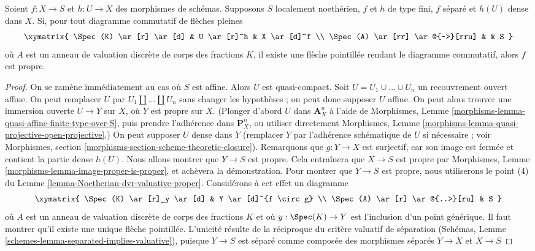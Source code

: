 \begin{lemma}
\label{lemma-refined-valuative-criterion-proper}
Soient $f : X \to S$ et $h : U \to X$ des morphismes de schémas.
Supposons $S$ localement noethérien, $f$ et $h$ de type fini,
$f$ séparé et $h(U)$ dense dans $X$.
Si, pour tout diagramme commutatif de flèches pleines
$$
\xymatrix{
\Spec(K) \ar[r] \ar[d] & U \ar[r]^h & X \ar[d]^f \\
\Spec(A) \ar[rr] \ar@{-->}[rru] & & S
}
$$
où $A$ est un anneau de valuation discrète de corps des fractions $K$,
il existe une flèche pointillée rendant le diagramme commutatif, alors $f$ est propre.
\end{lemma}

\begin{proof}
On se ramène immédiatement au cas où $S$ est affine.
Alors $U$ est quasi-compact.
Soit $U = U_1 \cup \ldots \cup U_n$ un recouvrement ouvert affine.
On peut remplacer $U$ par $U_1 \amalg \ldots \amalg U_n$ sans
changer les hypothèses ; on peut donc supposer $U$ affine.
On peut alors trouver une immersion ouverte $U \to Y$ sur $X$,
où $Y$ est propre sur $X$. (Plonger d'abord $U$ dans $\mathbf{A}^n_X$
à l'aide de Morphismes, Lemme \ref{morphisms-lemma-quasi-affine-finite-type-over-S},
puis prendre l'adhérence dans $\mathbf{P}^n_X$, ou utiliser directement
Morphismes, Lemme \ref{morphisms-lemma-quasi-projective-open-projective}.)
On peut supposer $U$ dense dans $Y$ (remplacer $Y$ par l'adhérence schématique
de $U$ si nécessaire ; voir Morphismes, section
\ref{morphisms-section-scheme-theoretic-closure}).
Remarquons que $g : Y \to X$ est surjectif, car son image est fermée
et contient la partie dense $h(U)$.
Nous allons montrer que $Y \to S$ est propre. Cela entraînera que
$X \to S$ est propre par
Morphismes, Lemme \ref{morphisms-lemma-image-proper-is-proper},
et achèvera la démonstration.
Pour montrer que $Y \to S$ est propre, nous utiliserons
le point (4) du Lemme \ref{lemma-Noetherian-dvr-valuative-proper}.
Considérons à cet effet un diagramme
$$
\xymatrix{
\Spec(K) \ar[r]_y \ar[d] & Y \ar[d]^{f \circ g} \\
\Spec(A) \ar[r] \ar@{..>}[ru] & S
}
$$
où $A$ est un anneau de valuation discrète de corps des fractions $K$
et où $y : \Spec(K) \to Y$ est l'inclusion d'un point générique.
Il faut montrer qu'il existe une unique flèche pointillée.
L'unicité résulte de la réciproque du critère valuatif
de séparation
(Schémas, Lemme \ref{schemes-lemma-separated-implies-valuative}),
puisque $Y \to S$ est séparé comme
composée des morphismes séparés $Y \to X$ et $X \to S$

\end{proof}
